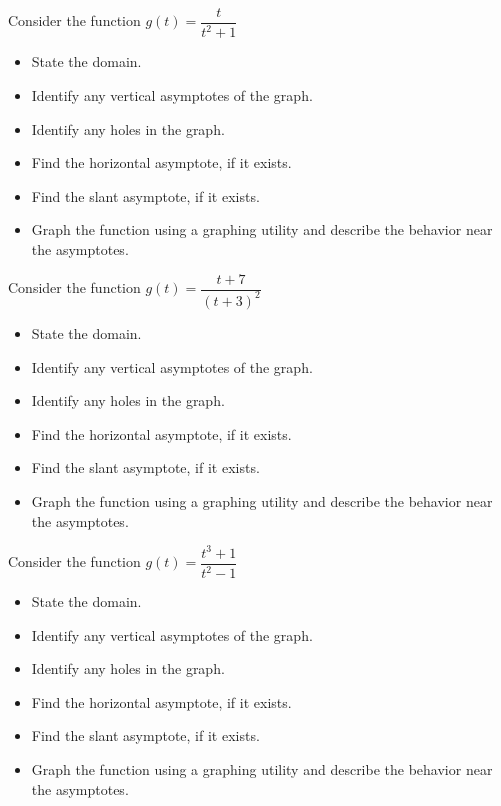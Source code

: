 \documentclass{ximera}
\begin{document}
\begin{problem}
Consider the function $g(t) = \dfrac{t}{t^{2} + 1}$
\begin{itemize}
\item State the domain.
\item Identify any vertical asymptotes of the graph.
\item Identify any holes in the graph.
\item Find the horizontal asymptote, if it exists.
\item Find the slant asymptote, if it exists.
\item Graph the function using a graphing utility and describe the behavior near the asymptotes.
\end{itemize}
\end{problem} 

\begin{problem}
Consider the function $g(t) = \dfrac{t + 7}{(t + 3)^{2}}$
\begin{itemize}
\item State the domain.
\item Identify any vertical asymptotes of the graph.
\item Identify any holes in the graph.
\item Find the horizontal asymptote, if it exists.
\item Find the slant asymptote, if it exists.
\item Graph the function using a graphing utility and describe the behavior near the asymptotes.
\end{itemize}
\end{problem} 

\begin{problem}
Consider the function $g(t) = \dfrac{t^{3} + 1}{t^{2} - 1}$
\begin{itemize}
\item State the domain.
\item Identify any vertical asymptotes of the graph.
\item Identify any holes in the graph.
\item Find the horizontal asymptote, if it exists.
\item Find the slant asymptote, if it exists.
\item Graph the function using a graphing utility and describe the behavior near the asymptotes.
\end{itemize}
\end{problem} 
\end{document}
